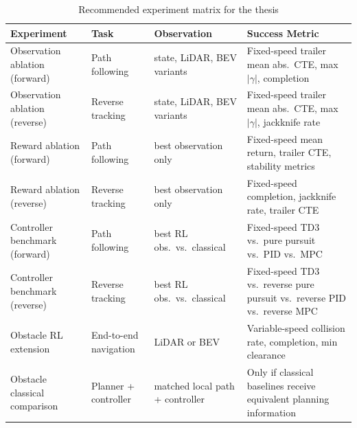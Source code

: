 \begin{table}[H]
\centering
\caption{Recommended experiment matrix for the thesis}
\label{tab:experiment_matrix}
\small
\begin{tabular}{>{\raggedright\arraybackslash}p{3.6cm} >{\raggedright\arraybackslash}p{2.5cm} >{\raggedright\arraybackslash}p{2.7cm} >{\raggedright\arraybackslash}p{4.6cm}}
\toprule
Experiment & Task & Observation & Success Metric \\
\midrule
Observation ablation (forward) & Path following & state, LiDAR, BEV variants & Fixed-speed trailer mean abs.\ CTE, max $|\gamma|$, completion \\
Observation ablation (reverse) & Reverse tracking & state, LiDAR, BEV variants & Fixed-speed trailer mean abs.\ CTE, max $|\gamma|$, jackknife rate \\
Reward ablation (forward) & Path following & best observation only & Fixed-speed mean return, trailer CTE, stability metrics \\
Reward ablation (reverse) & Reverse tracking & best observation only & Fixed-speed completion, jackknife rate, trailer CTE \\
Controller benchmark (forward) & Path following & best RL obs.\ vs.\ classical & Fixed-speed TD3 vs.\ pure pursuit vs.\ PID vs.\ MPC \\
Controller benchmark (reverse) & Reverse tracking & best RL obs.\ vs.\ classical & Fixed-speed TD3 vs.\ reverse pure pursuit vs.\ reverse PID vs.\ reverse MPC \\
Obstacle RL extension & End-to-end navigation & LiDAR or BEV & Variable-speed collision rate, completion, min clearance \\
Obstacle classical comparison & Planner + controller & matched local path + controller & Only if classical baselines receive equivalent planning information \\
\bottomrule
\end{tabular}
\end{table}
